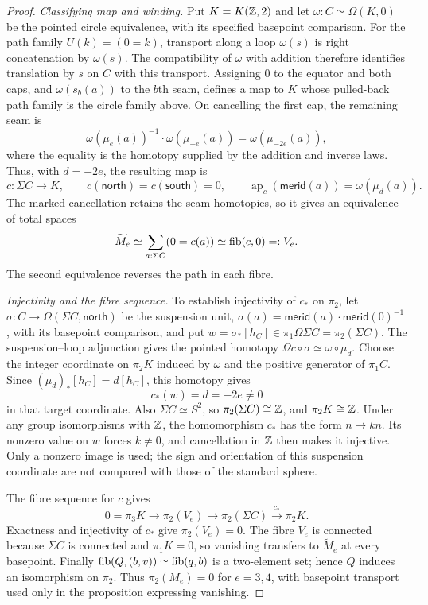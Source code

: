 \begin{proof}
\emph{Classifying map and winding.} Put $K=K(\mathbb Z,2)$ and let $\omega:C\simeq\Omega(K,0)$ be the pointed circle equivalence, with its specified basepoint comparison. For the path family $U(k)=(0=k)$, transport along a loop $\omega(s)$ is right concatenation by $\omega(s)$. The compatibility of $\omega$ with addition therefore identifies translation by $s$ on $C$ with this transport. Assigning $0$ to the equator and both caps, and $\omega(s_b(a))$ to the $b$th seam, defines a map to $K$ whose pulled-back path family is the circle family above. On cancelling the first cap, the remaining seam is
\[
\omega(\mu_e(a))^{-1}\cdot\omega(\mu_{-e}(a))
 =\omega(\mu_{-2e}(a)),
\]
where the equality is the homotopy supplied by the addition and inverse laws. Thus, with $d=-2e$, the resulting map is
\[
c:\Sigma C\longrightarrow K,
\qquad c(\mathsf{north})=c(\mathsf{south})=0,
\qquad \operatorname{ap}_c(\mathsf{merid}(a))=\omega(\mu_d(a)).
\]
The marked cancellation retains the seam homotopies, so it gives an equivalence of total spaces
\[
\widetilde M_e\simeq\sum_{a:\Sigma C}(0=c(a))
 \simeq\operatorname{fib}(c,0)=:V_e.
\]
The second equivalence reverses the path in each fibre.

\emph{Injectivity and the fibre sequence.} To establish injectivity of $c_*$ on $\pi_2$, let
$\sigma:C\to\Omega(\Sigma C,\mathsf{north})$ be the suspension unit,
$\sigma(a)=\mathsf{merid}(a)\cdot\mathsf{merid}(0)^{-1}$,
with its basepoint comparison, and put
$w=\sigma_*[h_C]\in\pi_1\Omega\Sigma C=\pi_2(\Sigma C)$.
The suspension--loop adjunction gives the pointed homotopy
$\Omega c\circ\sigma\simeq\omega\circ\mu_d$.
Choose the integer coordinate on $\pi_2K$ induced by $\omega$ and the positive generator of $\pi_1C$. Since $(\mu_d)_*[h_C]=d[h_C]$, this homotopy gives
\[
c_*(w)=d=-2e\neq0
\]
in that target coordinate. Also $\Sigma C\simeq S^2$, so $\pi_2(\Sigma C)\cong\mathbb Z$, and $\pi_2K\cong\mathbb Z$. Under any group isomorphisms with $\mathbb Z$, the homomorphism $c_*$ has the form $n\mapsto kn$. Its nonzero value on $w$ forces $k\neq0$, and cancellation in $\mathbb Z$ then makes it injective. Only a nonzero image is used; the sign and orientation of this suspension coordinate are not compared with those of the standard sphere.

The fibre sequence for $c$ gives
\[
0=\pi_3K\longrightarrow\pi_2(V_e)
 \longrightarrow\pi_2(\Sigma C)
 \xrightarrow{c_*}\pi_2K.
\]
Exactness and injectivity of $c_*$ give $\pi_2(V_e)=0$. The fibre $V_e$ is connected because $\Sigma C$ is connected and $\pi_1K=0$, so vanishing transfers to $\widetilde M_e$ at every basepoint. Finally $\operatorname{fib}(Q,(b,v))\simeq\operatorname{fib}(q,b)$ is a two-element set; hence $Q$ induces an isomorphism on $\pi_2$. Thus $\pi_2(M_e)=0$ for $e=3,4$, with basepoint transport used only in the proposition expressing vanishing.
\end{proof}

